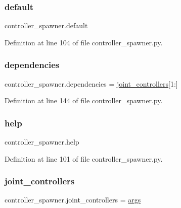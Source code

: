 \subsubsection{\texorpdfstring{default}{default}}
{\footnotesize\ttfamily controller\+\_\+spawner.\+default}



Definition at line 104 of file controller\+\_\+spawner.\+py.

\mbox{\label{namespacecontroller__spawner_a87f13bb4c1231b1185b29976f98aa894}} 
\subsubsection{\texorpdfstring{dependencies}{dependencies}}
{\footnotesize\ttfamily controller\+\_\+spawner.\+dependencies = \hyperlink{namespacecontroller__spawner_a4e454e12ceb216c43975a5ad8abee590}{joint\+\_\+controllers}\mbox{[}1\+:\mbox{]}}



Definition at line 144 of file controller\+\_\+spawner.\+py.

\mbox{\label{namespacecontroller__spawner_a6fd1b66d8e083807ae119d55764a2dff}} 
\subsubsection{\texorpdfstring{help}{help}}
{\footnotesize\ttfamily controller\+\_\+spawner.\+help}



Definition at line 101 of file controller\+\_\+spawner.\+py.

\mbox{\label{namespacecontroller__spawner_a4e454e12ceb216c43975a5ad8abee590}} 
\subsubsection{\texorpdfstring{joint\+\_\+controllers}{joint\_controllers}}
{\footnotesize\ttfamily controller\+\_\+spawner.\+joint\+\_\+controllers = \hyperlink{namespacecontroller__spawner_aa4c2175a779b73777468233b45686392}{args}}



